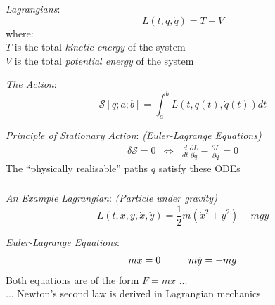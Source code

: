 \documentclass[xetex,serif,mathserif]{beamer}
\newenvironment{slide}[1]{\begin{frame}\frametitle{#1}}{\end{frame}}
\begin{document}
\begin{slide}{}
  \textcolor{titlered}{\emph{Lagrangians}}:
  \begin{displaymath}
    L(t,q,\dot{q}) = T - V
  \end{displaymath}
  \quad where: \\
  \quad\quad $T$ is the total \emph{kinetic energy} of the system \\
  \quad\quad $V$ is the total \emph{potential energy} of the system

  \bigskip

  \textcolor{titlered}{\emph{The Action}}:
  \begin{displaymath}
    \mathcal{S}[q;a;b] = \int_a^bL(t,q(t),\dot{q}(t)) dt
  \end{displaymath}

  \bigskip

  \textcolor{titlered}{\emph{Principle of Stationary Action}}: \hspace{1cm} \textcolor{black!60}{\emph{(Euler-Lagrange Equations)}}
  \begin{displaymath}
    \begin{array}{lcl}
      \delta \mathcal{S} = 0
      & \Leftrightarrow &
      \frac{d}{dt}\frac{\partial L}{\partial \dot{q}} - \frac{\partial L}{\partial q} = 0
    \end{array}
  \end{displaymath}
  \quad The “physically realisable” paths $q$ satisfy these ODEs
\end{slide}

\begin{slide}{}
  \textcolor{titlered}{\emph{An Example Lagrangian}}: \hspace{2cm} \textcolor{black!60}{\emph{(Particle under gravity)}}
  \begin{displaymath}
    L(t,x,y,\dot{x},\dot{y}) = \frac{1}{2}m(\dot{x}^2 + \dot{y}^2) - mgy
  \end{displaymath}

  \pause
  \bigskip

  \textcolor{titlered}{\emph{Euler-Lagrange Equations}}:
  \begin{displaymath}
    \begin{array}{l@{\hspace{1cm}}l}
      m\ddot{x} = 0 & m\ddot{y} = -mg
    \end{array}
  \end{displaymath}
  \quad\quad Both equations are of the form $F = m\ddot{x}$ ... \\
  \quad\quad ... Newton’s second law is derived in Lagrangian mechanics
\end{slide}
\end{document}
